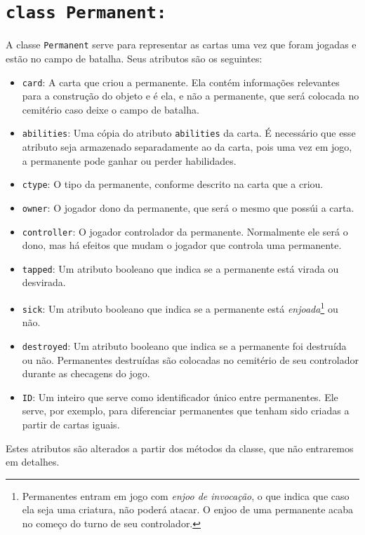 \section{\texttt{class Permanent:}}
A classe \texttt{Permanent} serve para representar as cartas uma vez que foram jogadas
e estão no campo de batalha. Seus atributos são os seguintes:
\begin{itemize}
  \item\texttt{card}: A carta que criou a permanente. Ela contém informações relevantes
  para a construção do objeto e é ela, e não a permanente, que será colocada no cemitério
  caso deixe o campo de batalha.
  \item\texttt{abilities}: Uma cópia do atributo \texttt{abilities} da carta. É necessário
  que esse atributo seja armazenado separadamente ao da carta, pois uma vez em jogo, a
  permanente pode ganhar ou perder habilidades.
  \item\texttt{ctype}: O tipo da permanente, conforme descrito na carta que a criou.
  \item\texttt{owner}: O jogador dono da permanente, que será o mesmo que possúi a carta.
  \item\texttt{controller}: O jogador controlador da permanente. Normalmente ele será o dono,
  mas há efeitos que mudam o jogador que controla uma permanente.
  \item\texttt{tapped}: Um atributo booleano que indica se a permanente está virada ou
  desvirada.
  \item\texttt{sick}: Um atributo booleano que indica se a permanente está
  \textit{enjoada}\footnote{Permanentes entram em jogo com \textit{enjoo de invocação}, o que
  indica que caso ela seja uma criatura, não poderá atacar. O enjoo de uma permanente acaba no
  começo do turno de seu controlador.} ou não.
  \item\texttt{destroyed}: Um atributo booleano que indica se a permanente foi destruída ou não.
  Permanentes destruídas são colocadas no cemitério de seu controlador durante as checagens do jogo.
  \item\texttt{ID}: Um inteiro que serve como identificador único entre permanentes. Ele serve,
  por exemplo, para diferenciar permanentes que tenham sido criadas a partir de cartas iguais.
\end{itemize}
Estes atributos são alterados a partir dos métodos da classe, que não entraremos em detalhes.


